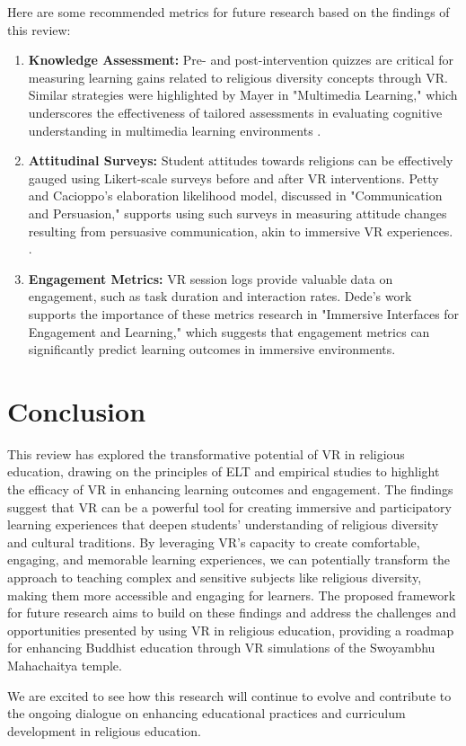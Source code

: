 \documentclass[conference]{IEEEtran}
\begin{document}
Here are some recommended metrics for future research based on the findings of this review:

\begin{enumerate}
    \item \textbf{Knowledge Assessment:} Pre- and post-intervention quizzes are critical for measuring learning gains related to religious diversity concepts through VR. Similar strategies were highlighted by Mayer \cite{Mayer_2020} in "Multimedia Learning," which underscores the effectiveness of tailored assessments in evaluating cognitive understanding in multimedia learning environments \cite{li_religious_2023} \cite{gleason_developing_2022}.
    \item \textbf{Attitudinal Surveys:} Student attitudes towards religions can be effectively gauged using Likert-scale surveys before and after VR interventions. Petty and Cacioppo's \cite{berkowitz_elaboration_1986} elaboration likelihood model, discussed in "Communication and Persuasion," supports using such surveys in measuring attitude changes resulting from persuasive communication, akin to immersive VR experiences. \cite{kyaw_comparing_2023}.
    \item \textbf{Engagement Metrics:} VR session logs provide valuable data on engagement, such as task duration and interaction rates. Dede's work \cite{Dede2009} supports the importance of these metrics research in "Immersive Interfaces for Engagement and Learning," which suggests that engagement metrics can significantly predict learning outcomes in immersive environments.
\end{enumerate}

\section{Conclusion}

This review has explored the transformative potential of VR in religious education, drawing on the principles of ELT and empirical studies to highlight the efficacy of VR in enhancing learning outcomes and engagement. The findings suggest that VR can be a powerful tool for creating immersive and participatory learning experiences that deepen students' understanding of religious diversity and cultural traditions. By leveraging VR's capacity to create comfortable, engaging, and memorable learning experiences, we can potentially transform the approach to teaching complex and sensitive subjects like religious diversity, making them more accessible and engaging for learners. The proposed framework for future research aims to build on these findings and address the challenges and opportunities presented by using VR in religious education, providing a roadmap for enhancing Buddhist education through VR simulations of the Swoyambhu Mahachaitya temple.

We are excited to see how this research will continue to evolve and contribute to the ongoing dialogue on enhancing educational practices and curriculum development in religious education.

\nocite{*}




\end{document}
